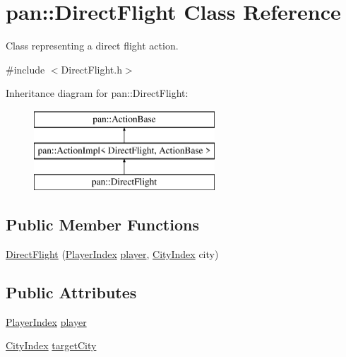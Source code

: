 \hypertarget{classpan_1_1_direct_flight}{}\section{pan\+:\+:Direct\+Flight Class Reference}
\label{classpan_1_1_direct_flight}


Class representing a direct flight action.  




{\ttfamily \#include $<$Direct\+Flight.\+h$>$}

Inheritance diagram for pan\+:\+:Direct\+Flight\+:\begin{figure}[H]
\begin{center}
\leavevmode
\includegraphics[height=3.000000cm]{classpan_1_1_direct_flight}
\end{center}
\end{figure}
\subsection*{Public Member Functions}
\begin{DoxyCompactItemize}
\item 
\hyperlink{classpan_1_1_direct_flight_adb9d5acdd3f9fd5288861dd53f06dfe7}{Direct\+Flight} (\hyperlink{namespacepan_a0cdabf874fbf1bb3a1f0152d108c2909}{Player\+Index} \hyperlink{classpan_1_1_direct_flight_afe5a2a1f145f99e778cb3cff80b7d54b}{player}, \hyperlink{namespacepan_afaed28aa6603153dcc062a028602d697}{City\+Index} city)
\end{DoxyCompactItemize}
\subsection*{Public Attributes}
\begin{DoxyCompactItemize}
\item 
\hyperlink{namespacepan_a0cdabf874fbf1bb3a1f0152d108c2909}{Player\+Index} \hyperlink{classpan_1_1_direct_flight_afe5a2a1f145f99e778cb3cff80b7d54b}{player}
\item 
\hyperlink{namespacepan_afaed28aa6603153dcc062a028602d697}{City\+Index} \hyperlink{classpan_1_1_direct_flight_a6781e6dab81c55f2ed96352cad0c793d}{target\+City}
\end{DoxyCompactItemize}



